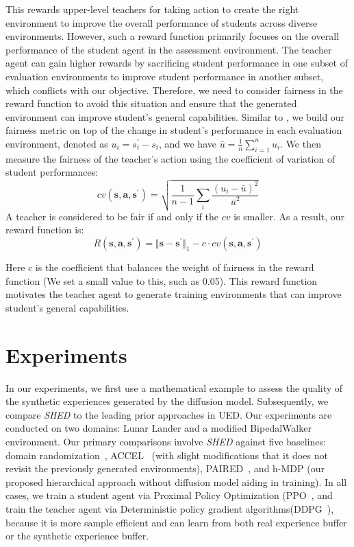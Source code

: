\documentclass{article}
\newcommand\algo{\emph{SHED }}
\newcommand\va{\bm{a}}
\newcommand\vs{\bm{s}}
\begin{document}
This rewards upper-level teachers for taking action to create the right environment to improve the overall performance of students across diverse environments. However, such a reward function primarily focuses on the overall performance of the student agent in the assessment environment. The teacher agent can gain higher rewards by sacrificing student performance in one subset of evaluation environments to improve student performance in another subset, which conflicts with our objective. Therefore, we need to consider fairness in the reward function to avoid this situation and ensure that the generated environment can improve student's general capabilities. Similar to \cite{elmalaki2021fair}, we build our fairness metric on top of the change in student's performance in each evaluation environment, denoted as $u_i=s_i^\prime - s_i$, and we have $\bar{u}=\frac{1}{n}\sum_{i=1}^n u_i$.
We then measure the fairness of the teacher's action using the coefficient of variation of student performances:
\begin{equation}
    cv(\vs, \va,\vs^{\prime}) = \sqrt{\frac{1}{n-1}\sum_i \frac{(u_i-\bar{u})^2}{\bar{u}^2}}
\end{equation}
A teacher is considered to be fair if and only if the $cv$ is smaller. As a result, our reward function is:
\begin{equation}
    R(\vs, \va,\vs^{\prime}) = \Vert \vs-\vs^\prime \Vert_1 - c\cdot cv(\vs, \va,\vs^{\prime})
\end{equation}

Here $c$ is the coefficient that balances the weight of fairness in the reward function (We set a small value to this, such as 0.05). This reward function motivates the teacher agent to generate training environments that can improve student's general capabilities.


\section{Experiments}
In our experiments, we first use a mathematical example to assess the quality of the synthetic experiences generated by the diffusion model. Subsequently, we compare \algo to the leading prior approaches in UED. Our experiments are conducted on two domains: Lunar Lander and a modified BipedalWalker environment. 
Our primary comparisons involve \algo against five baselines: domain randomization~\citep{tobin2017domain}, ACCEL~\citep{parker2022evolving} (with slight modifications that it does not revisit the previously generated environments), PAIRED~\citep{dennis2020emergent}, and h-MDP (our proposed hierarchical approach without diffusion model aiding in training).
In all cases, we train a student agent via Proximal Policy Optimization (PPO~\citep{schulman2017proximal}, and train the teacher agent via Deterministic policy gradient algorithms(DDPG~\citep{silver2014deterministic}), because it is more sample efficient and can learn from both real experience buffer or the synthetic experience buffer.
\end{document}
